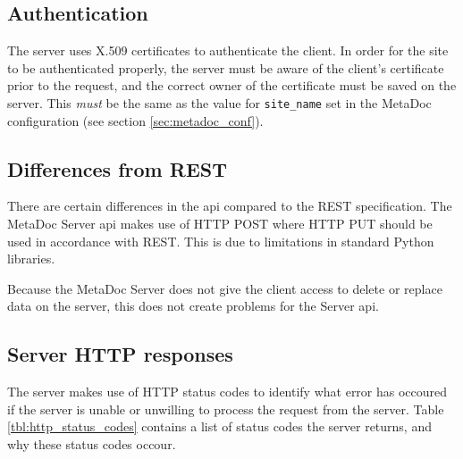 \subsection{Authentication}
\label{sec:authentication}
The server uses X.509 certificates to authenticate the client. In order for the
site to be authenticated properly, the server must be aware of the client's
certificate prior to the request, and the correct owner of the certificate must
be saved on the server. This \textit{must} be the same as the value for
\texttt{site\_name} set in the MetaDoc configuration (see section
\ref{sec:metadoc_conf}).

\subsection{Differences from REST}
\label{sec:diff_from_rest}

There are certain differences in the \gls{api} compared to the REST
specification. The MetaDoc Server \gls{api} makes use of HTTP POST where HTTP
PUT should be used in accordance with REST. This is due to limitations in
standard Python libraries.

Because the MetaDoc Server does not give the client access to delete or replace
data on the server, this does not create problems for the Server \gls{api}. %

\subsection{Server HTTP responses}

The server makes use of HTTP status codes to identify what error has occoured
if the server is unable or unwilling to process the request from the server.
Table \ref{tbl:http_status_codes} contains a list of status codes the server
returns, and why these status codes occour. 

